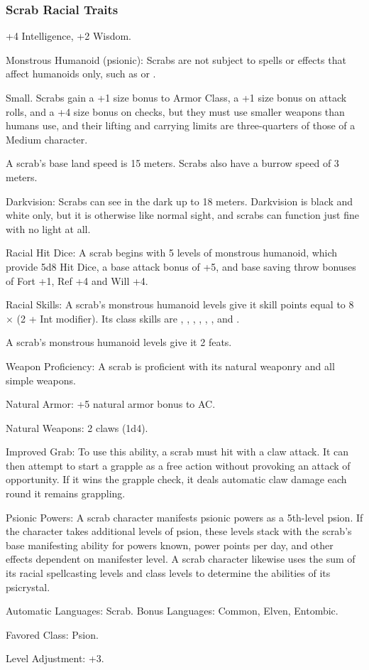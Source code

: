 \subsubsection{Scrab Racial Traits}
\begin{itemize*}
    \item +4 Intelligence, +2 Wisdom.
    \item Monstrous Humanoid (psionic): Scrabs are not subject to spells or effects that affect humanoids only, such as  or .
    \item Small. Scrabs gain a +1 size bonus to Armor Class, a +1 size bonus on attack rolls, and a +4 size bonus on  checks, but they must use smaller weapons than humans use, and their lifting and carrying limits are three-quarters of those of a Medium character.
    \item A scrab's base land speed is 15 meters. Scrabs also have a burrow speed of 3 meters.

    \item Darkvision: Scrabs can see in the dark up to 18 meters. Darkvision is black and white only, but it is otherwise like normal sight, and scrabs can function just fine with no light at all.

    \item Racial Hit Dice: A scrab begins with 5 levels of monstrous humanoid, which provide 5d8 Hit Dice, a base attack bonus of +5, and base saving throw bonuses of Fort +1, Ref +4 and Will +4.
    \item Racial Skills: A scrab's monstrous humanoid levels give it skill points equal to 8 $\times$ (2 + Int modifier). Its class skills are , , , , , , and .
    \item A scrab's monstrous humanoid levels give it 2 feats.

    \item Weapon Proficiency: A scrab is proficient with its natural weaponry and all simple weapons.
    \item Natural Armor: +5 natural armor bonus to AC.
    \item Natural Weapons: 2 claws (1d4).

    \item Improved Grab: To use this ability, a scrab must hit with a claw attack. It can then attempt to start a grapple as a free action without provoking an attack of opportunity. If it wins the grapple check, it deals automatic claw damage each round it remains grappling.
	\item Psionic Powers: A scrab character manifests psionic powers as a 5th-level psion. If the character takes additional levels of psion, these levels stack with the scrab's base manifesting ability for powers known, power points per day, and other effects dependent on manifester level. A scrab character likewise uses the sum of its racial spellcasting levels and class levels to determine the abilities of its psicrystal.

    \item Automatic Languages: Scrab. Bonus Languages: Common, Elven, Entombic.
    \item Favored Class: Psion.
    \item Level Adjustment: +3.
\end{itemize*}
